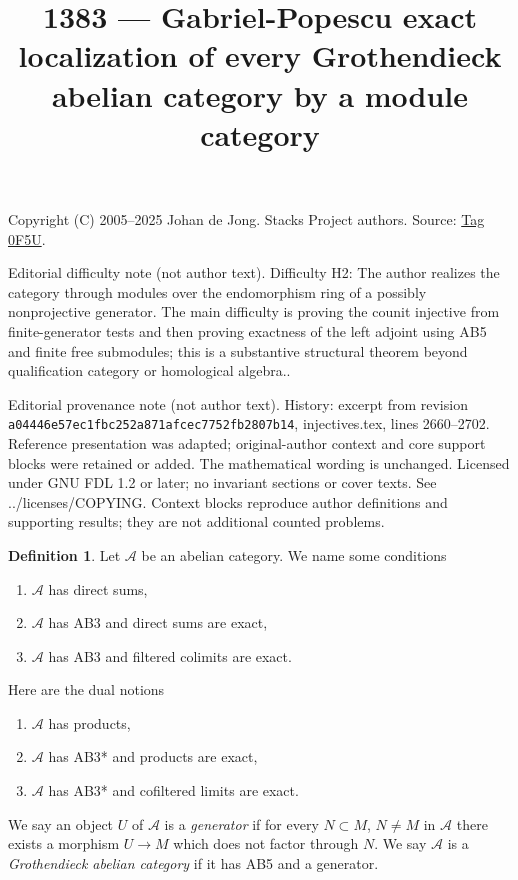 \documentclass{amsart}
\theoremstyle{plain}
\theoremstyle{definition}
\newtheorem{definition}[subsection]{Definition}
\theoremstyle{remark}
\numberwithin{equation}{subsection}
\begin{document}
\title[Stacks Project, Tag 0F5U]{1383 --- Gabriel-Popescu exact localization of every Grothendieck abelian category by a module category}
\maketitle
\noindent Copyright (C) 2005--2025 Johan de Jong. Stacks Project authors. Source: \href{https://stacks.math.columbia.edu/tag/0F5U}{Tag 0F5U}.

\noindent Editorial difficulty note (not author text). Difficulty H2: The author realizes the category through modules over the endomorphism ring of a possibly nonprojective generator. The main difficulty is proving the counit injective from finite-generator tests and then proving exactness of the left adjoint using AB5 and finite free submodules; this is a substantive structural theorem beyond qualification category or homological algebra..

\noindent Editorial provenance note (not author text). History: excerpt from revision \texttt{a0444\allowbreak 6e57e\allowbreak c1fbc\allowbreak 252a8\allowbreak 71afc\allowbreak ec775\allowbreak 2fb28\allowbreak 07b14}, injectives.tex, lines 2660--2702. Reference presentation was adapted; original-author context and core support blocks were retained or added. The mathematical wording is unchanged. Licensed under GNU FDL 1.2 or later; no invariant sections or cover texts. See ../licenses/COPYING. Context blocks reproduce author definitions and supporting results; they are not additional counted problems.

\begin{definition}
\label{definition-grothendieck-conditions}
Let $\mathcal{A}$ be an abelian category. We name some conditions
\begin{enumerate}
\item[AB3] $\mathcal{A}$ has direct sums,
\item[AB4] $\mathcal{A}$ has AB3 and direct sums are exact,
\item[AB5] $\mathcal{A}$ has AB3 and filtered colimits are exact.
\end{enumerate}
Here are the dual notions
\begin{enumerate}
\item[AB3*] $\mathcal{A}$ has products,
\item[AB4*] $\mathcal{A}$ has AB3* and products are exact,
\item[AB5*] $\mathcal{A}$ has AB3* and cofiltered limits are exact.
\end{enumerate}
We say an object $U$ of $\mathcal{A}$ is a {\it generator} if
for every $N \subset M$, $N \not = M$ in $\mathcal{A}$ there exists a morphism
$U \to M$ which does not factor through $N$.
We say $\mathcal{A}$ is a {\it Grothendieck abelian category} if
it has AB5 and a generator.
\end{definition}
\end{document}
